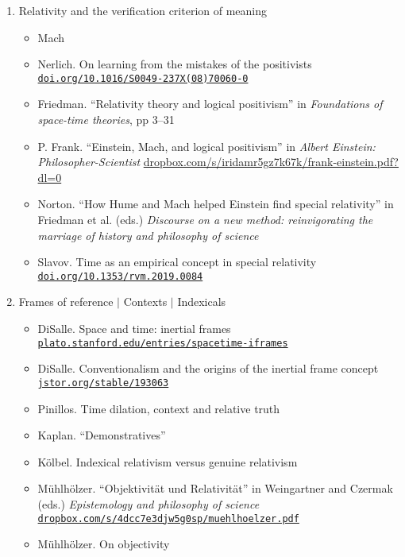 \documentclass[11pt]{article}
\newcommand\rurl[1]{%
  \href{http://#1}{\nolinkurl{#1}}%
}
\begin{document}
\begin{enumerate}
\item Relativity and the verification criterion of meaning
  \begin{itemize}
  \item Mach  
  \item Nerlich. On learning from the mistakes of the positivists
    \rurl{doi.org/10.1016/S0049-237X(08)70060-0}
  \item Friedman. ``Relativity theory and logical positivism'' in
    \emph{Foundations of space-time theories}, pp 3--31
  \item P. Frank. ``Einstein, Mach, and logical positivism'' in
    \textit{Albert Einstein: Philosopher-Scientist}
    \url{dropbox.com/s/iridamr5gz7k67k/frank-einstein.pdf?dl=0}
  \item Norton. ``How Hume and Mach helped Einstein find special
    relativity'' in Friedman et al. (eds.) \textit{Discourse on a new
      method: reinvigorating the marriage of history and philosophy of
      science}
  \item Slavov. Time as an empirical concept in special relativity
    \rurl{doi.org/10.1353/rvm.2019.0084}
  \end{itemize}  
  
\item Frames of reference $|$ Contexts $|$ Indexicals
  \begin{itemize}
  \item DiSalle. Space and time: inertial frames
    \rurl{plato.stanford.edu/entries/spacetime-iframes}
  \item DiSalle. Conventionalism and the origins of the inertial frame
    concept \rurl{jstor.org/stable/193063}
  \item Pinillos. Time dilation, context and relative truth
  \item Kaplan. ``Demonstratives''
  \item K{\"o}lbel. Indexical relativism versus genuine relativism
  \item Mühlhölzer. ``Objektivität und Relativität'' in Weingartner
    and Czermak (eds.) \textit{Epistemology and philosophy of science}
    \rurl{dropbox.com/s/4dcc7e3djw5g0sp/muehlhoelzer.pdf}
\item Mühlhölzer. On objectivity 
\end{itemize}


\end{enumerate}
\end{document}
